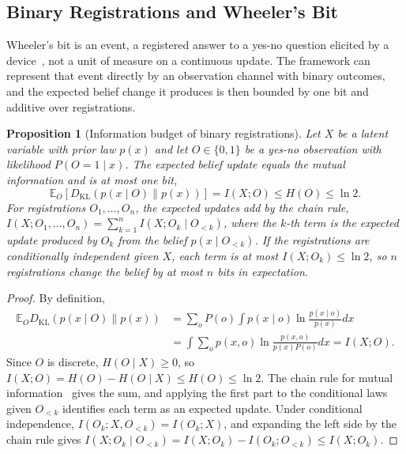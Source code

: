 \documentclass[11pt]{article}
\newtheorem{proposition}{Proposition}
\begin{document}
\subsection{Binary Registrations and Wheeler's Bit}
\label{sec:binary_registration}

Wheeler's bit is an event, a registered answer to a yes-no question elicited by a device~\cite{Wheeler1990}, not a unit of measure on a continuous update. The framework can represent that event directly by an observation channel with binary outcomes, and the expected belief change it produces is then bounded by one bit and additive over registrations.

\begin{proposition}[Information budget of binary registrations]\label{prop:binary_registration}
Let $X$ be a latent variable with prior law $p(x)$ and let $O \in \{0,1\}$ be a yes-no observation with likelihood $P(O=1 \mid x)$. The expected belief update equals the mutual information and is at most one bit,
\begin{equation}
\mathbb{E}_{O}\left[D_{\mathrm{KL}}\left(p(x \mid O) \| p(x)\right)\right] = I(X;O) \le H(O) \le \ln 2 .
\label{eq:registration_bound}
\end{equation}
For registrations $O_1, \ldots, O_n$, the expected updates add by the chain rule, $I(X; O_1, \ldots, O_n) = \sum_{k=1}^n I(X; O_k \mid O_{<k})$, where the $k$-th term is the expected update produced by $O_k$ from the belief $p(x \mid O_{<k})$. If the registrations are conditionally independent given $X$, each term is at most $I(X;O_k) \le \ln 2$, so $n$ registrations change the belief by at most $n$ bits in expectation.
\end{proposition}
\begin{proof}
By definition,
\begin{align*}
\mathbb{E}_O D_{\mathrm{KL}}(p(x\mid O)\|p(x)) &= \sum_o P(o)\int p(x\mid o)\ln\frac{p(x\mid o)}{p(x)}dx \\
&= \int\sum_o p(x,o)\ln\frac{p(x,o)}{p(x)P(o)}dx = I(X;O).
\end{align*}
Since $O$ is discrete, $H(O \mid X) \ge 0$, so $I(X;O) = H(O) - H(O\mid X) \le H(O) \le \ln 2$. The chain rule for mutual information~\cite[Thm.~2.5.2]{CoverThomas2006} gives the sum, and applying the first part to the conditional laws given $O_{<k}$ identifies each term as an expected update. Under conditional independence, $I(O_k; X, O_{<k}) = I(O_k; X)$, and expanding the left side by the chain rule gives $I(X;O_k \mid O_{<k}) = I(X;O_k) - I(O_k;O_{<k}) \le I(X;O_k)$.
\end{proof}
\end{document}
